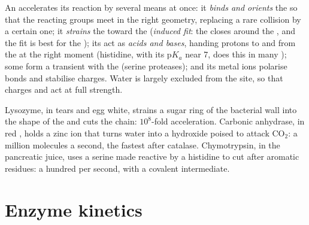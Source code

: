 \begin{proposition}\label{prop:b1:enzymes:mechanisms}
An  accelerates its reaction by several means at once: it
\emph{binds and orients} the  so that the reacting groups
meet in the right geometry, replacing a rare collision by a certain
one; it \emph{strains} the  toward the 
(\emph{induced fit}: the  closes around the
, and the fit is best for the ); its  act as \emph{acids and bases}, handing protons to and from the
 at the right moment (histidine, with its p$K_a$ near 7,
does this in many ); some form a transient \emph{} with the  (serine proteases); and its metal ions
polarise bonds and stabilise charges. Water is largely excluded from
the site, so that charges and  act at full strength.
\end{proposition}

\begin{example}\label{ex:b1:enzymes:three}
Lysozyme, in tears and egg white, strains a sugar ring of the bacterial
wall into the shape of the  and cuts the chain:
$10^8$-fold acceleration. Carbonic anhydrase, in red , holds a
zinc ion that turns water into a hydroxide poised to attack
$\mathrm{CO_2}$: a million molecules a second, the fastest 
after catalase. Chymotrypsin, in the pancreatic juice, uses a serine
made reactive by a histidine to cut  after aromatic residues:
a hundred per second, with a covalent intermediate.
\end{example}

\section{Enzyme kinetics}

